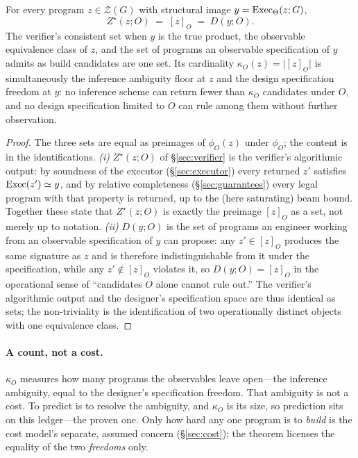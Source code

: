 \begin{theorem}\label{thm:duality}
For every program $z\in\mathcal{Z}(G)$ with structural image $y=\mathrm{Exec}_\Theta(z;G)$,
\[
\boxed{\,Z^{\star}(z;O)\;=\;[z]_O\;=\;D(y;O).\,}
\]
The verifier's consistent set when $y$ is the true product, the observable equivalence class of $z$, and
the set of programs an observable specification of $y$ admits as build candidates are one set. Its
cardinality $\kappa_O(z)=\bigl|[z]_O\bigr|$ is simultaneously the inference ambiguity floor at $z$ and the
design specification freedom at $y$: no inference scheme can return fewer than $\kappa_O$ candidates under
$O$, and no design specification limited to $O$ can rule among them without further observation.
\end{theorem}

\begin{proof}
The three sets are equal as preimages of $\phi_O(z)$ under $\phi_O$; the content is in the identifications.
\emph{(i)} $Z^{\star}(z;O)$ of \S\ref{sec:verifier} is the verifier's algorithmic output: by soundness of
the executor (\S\ref{sec:executor}) every returned $z'$ satisfies $\mathrm{Exec}(z')\simeq y$, and by relative
completeness (\S\ref{sec:guarantees}) every legal program with that property is returned, up to the (here
saturating) beam bound. Together these state that $Z^{\star}(z;O)$ is exactly the preimage $[z]_O$ as a
set, not merely up to notation. \emph{(ii)} $D(y;O)$ is the set of programs an engineer working from an
observable specification of $y$ can propose: any $z'\in[z]_O$ produces the same signature as $z$ and is
therefore indistinguishable from it under the specification, while any $z'\notin[z]_O$ violates it, so
$D(y;O)=[z]_O$ in the operational sense of ``candidates $O$ alone cannot rule out.'' The verifier's
algorithmic output and the designer's specification space are thus identical as sets; the non-triviality
is the identification of two operationally distinct objects with one equivalence class.
\end{proof}

\paragraph{A count, not a cost.} $\kappa_O$ measures how many programs the observables leave open---the
inference ambiguity, equal to the designer's specification freedom. That ambiguity is not a cost. To
predict is to resolve the ambiguity, and $\kappa_O$ is its size, so prediction sits on this ledger---the
proven one. Only how hard any one program is to \emph{build} is the cost model's separate, assumed concern
(\S\ref{sec:cost}); the theorem licenses the equality of the two \emph{freedoms} only.

